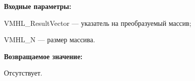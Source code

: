 \textbf{Входные параметры:}  
 
VMHL\_ResultVector --- указатель на преобразуемый массив;
 
VMHL\_N --- размер массива.

\textbf{Возвращаемое значение:}

Отсутствует.